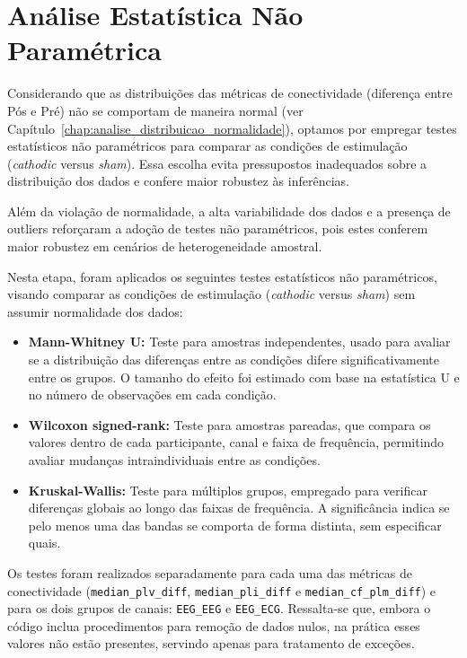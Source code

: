 \chapter{Análise Estatística Não Paramétrica}
\label{chap:analise_estatistica_np}

Considerando que as distribuições das métricas de conectividade (diferença entre Pós e Pré) não se comportam de maneira normal (ver Capítulo~\ref{chap:analise_distribuicao_normalidade}), optamos por empregar testes estatísticos não paramétricos para comparar as condições de estimulação (\texorpdfstring{\textit{cathodic} versus \textit{sham}}{cathodic versus sham}). Essa escolha evita pressupostos inadequados sobre a distribuição dos dados e confere maior robustez às inferências.

Além da violação de normalidade, a alta variabilidade dos dados e a presença de outliers reforçaram a adoção de testes não paramétricos, pois estes conferem maior robustez em cenários de heterogeneidade amostral.

Nesta etapa, foram aplicados os seguintes testes estatísticos não paramétricos, visando comparar as condições de estimulação (\textit{cathodic} versus \textit{sham}) sem assumir normalidade dos dados:

\begin{itemize}
    \item \textbf{Mann-Whitney U:} Teste para amostras independentes, usado para avaliar se a distribuição das diferenças entre as condições difere significativamente entre os grupos. O tamanho do efeito foi estimado com base na estatística U e no número de observações em cada condição.
    
    \item \textbf{Wilcoxon signed-rank:} Teste para amostras pareadas, que compara os valores dentro de cada participante, canal e faixa de frequência, permitindo avaliar mudanças intraindividuais entre as condições.

    \item \textbf{Kruskal-Wallis:} Teste para múltiplos grupos, empregado para verificar diferenças globais ao longo das faixas de frequência. A significância indica se pelo menos uma das bandas se comporta de forma distinta, sem especificar quais.
\end{itemize}

Os testes foram realizados separadamente para cada uma das métricas de conectividade (\texttt{median\_plv\_diff}, \texttt{median\_pli\_diff} e \texttt{median\_cf\_plm\_diff}) e para os dois grupos de canais: \texttt{EEG\_EEG} e \texttt{EEG\_ECG}. Ressalta-se que, embora o código inclua procedimentos para remoção de dados nulos, na prática esses valores não estão presentes, servindo apenas para tratamento de exceções.

